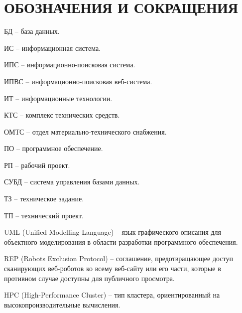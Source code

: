 \newsection
\section*{ОБОЗНАЧЕНИЯ И СОКРАЩЕНИЯ}

БД -- база данных.

ИС -- информационная система.

ИПС -- информационно-поисковая система.

ИПВС -- информационно-поисковая веб-система.

ИТ -- информационные технологии. 

КТС -- комплекс технических средств.

ОМТС -- отдел материально-технического снабжения. 

ПО -- программное обеспечение.

РП -- рабочий проект.

СУБД -- система управления базами данных.

ТЗ -- техническое задание.

ТП -- технический проект.

UML (Unified Modelling Language) -- язык графического описания для объектного моделирования в области разработки программного обеспечения.

REP (Robots Exclusion Protocol) -- соглашение, предотвращающее доступ сканирующих веб-роботов ко всему веб-сайту или его части, которые в противном случае доступны для публичного просмотра. 

HPC (High-Performance Cluster) -- тип кластера, ориентированный на высокопроизводительные вычисления.